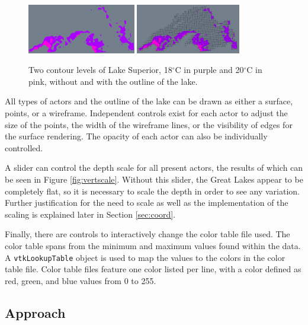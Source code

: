 \documentclass{article} %
\newcommand{\code}[1]{\texttt{#1}}
\begin{document}
\begin{figure}[htb]
   \centering
   \includegraphics[height=0.85in]{figures/lakewithoutframe.eps}
   \includegraphics[height=0.85in]{figures/lakewithframe.eps}
    \caption{Two contour levels of Lake Superior, 18$^\circ$C in purple and 20$^\circ$C in pink, without and with the outline of the lake.}
   \label{fig:frame}
\end{figure}

All types of actors and the outline of the lake can be drawn as either a surface, points, or a wireframe.  Independent controls exist for each actor to adjust the size of the points, the width of the wireframe lines, or the visibility of edges for the surface rendering. The opacity of each actor can also be individually controlled.

A slider can control the depth scale for all present actors, the results of which can be seen in Figure \ref{fig:vertscale}.  Without this slider, the Great Lakes appear to be completely flat, so it is necessary to scale the depth in order to see any variation.  Further justification for the need to scale as well as the implementation of the scaling is explained later in Section \ref{sec:coord}.

Finally, there are controls to interactively change the color table file used.  The color table spans from the minimum and maximum values found within the data.  A \code{vtkLookupTable} object is used to map the values to the colors in the color table file.  Color table files feature one color listed per line, with a color defined as red, green, and blue values from 0 to 255.

\subsection{Approach}
\end{document}
